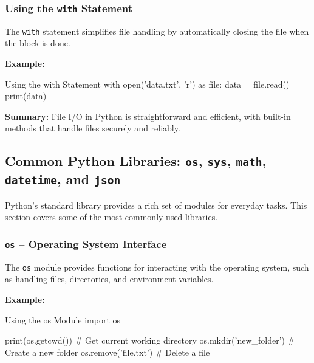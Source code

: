 %
\subsubsection{Using the \texttt{with} Statement}

The \texttt{with} statement simplifies file handling by automatically closing the file when the block is done.

\textbf{Example:}
\begin{codeonly}{Using the with Statement}
with open('data.txt', 'r') as file:
    data = file.read()
    print(data)
\end{codeonly}

\textbf{Summary:} File I/O in Python is straightforward and efficient, with built-in methods that handle files securely and reliably.

%
\subsection{Common Python Libraries: \texttt{os}, \texttt{sys}, \texttt{math}, \texttt{datetime}, and \texttt{json}}

Python’s standard library provides a rich set of modules for everyday tasks. This section covers some of the most commonly used libraries.

%
\subsubsection{\texttt{os} – Operating System Interface}

The \texttt{os} module provides functions for interacting with the operating system, such as handling files, directories, and environment variables.

\textbf{Example:}
\begin{codeonly}{Using the os Module}
import os

print(os.getcwd())  # Get current working directory
os.mkdir('new_folder')  # Create a new folder
os.remove('file.txt')  # Delete a file
\end{codeonly}

